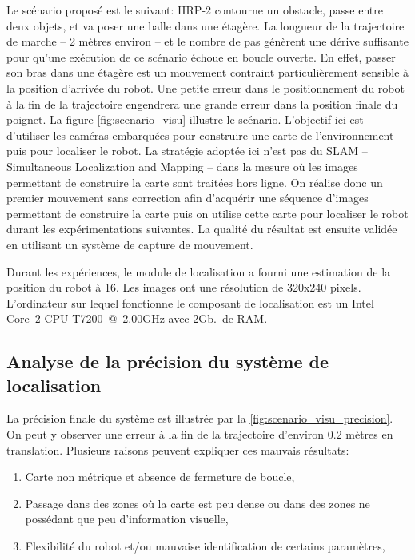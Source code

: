 Le scénario proposé est le suivant: HRP-2 contourne un obstacle, passe
entre deux objets, et va poser une balle dans une étagère. La longueur
de la trajectoire de marche -- 2 mètres environ -- et le nombre de pas
génèrent une dérive suffisante pour qu'une exécution de ce scénario
échoue en boucle ouverte. En effet, passer son bras dans une étagère
est un mouvement contraint particulièrement sensible à la position
d'arrivée du robot. Une petite erreur dans le positionnement du robot
à la fin de la trajectoire engendrera une grande erreur dans la
position finale du poignet. La figure \autoref{fig:scenario_visu}
illustre le scénario.  L'objectif ici est d'utiliser les caméras
embarquées pour construire une carte de l'environnement puis pour
localiser le robot. La stratégie adoptée ici n'est pas du SLAM --
Simultaneous Localization and Mapping -- dans la mesure où les images
permettant de construire la carte sont traitées hors ligne. On réalise
donc un premier mouvement sans correction afin d'acquérir une séquence
d'images permettant de construire la carte puis on utilise cette carte
pour localiser le robot durant les expérimentations suivantes. La
qualité du résultat est ensuite validée en utilisant un système de
capture de mouvement.


Durant les expériences, le module de localisation a fourni une
estimation de la position du robot à 16\hertz. Les images ont une
résolution de 320x240 pixels. L'ordinateur sur lequel fonctionne le
composant de localisation est un Intel\textregistered
Core\texttrademark\ 2 CPU T7200 @ 2.00GHz avec 2Gb.\ de RAM.


\subsection{Analyse de la précision du système de localisation}

La précision finale du système est illustrée par la
\autoref{fig:scenario_visu_precision}. On peut y observer une erreur à
la fin de la trajectoire d'environ 0.2 mètres en
translation. Plusieurs raisons peuvent expliquer ces mauvais
résultats:
\begin{enumerate}
\item Carte non métrique et absence de fermeture de boucle,
\item Passage dans des zones où la carte est peu dense ou dans des
  zones ne possédant que peu d'information visuelle,
\item Flexibilité du robot et/ou mauvaise identification de certains paramètres,
\end{enumerate}


